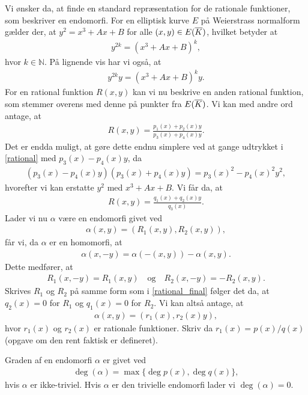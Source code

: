 Vi ønsker da, at finde en standard repræsentation for de rationale funktioner, som
beskriver en endomorfi. For en elliptisk kurve $E$ på Weierstrass normalform gælder
der, at $y^2 = x^3 + Ax + B$ for alle $(x, y) \in E(\overline{K})$, hvilket betyder at
\begin{align*}
	y^{2k} = (x^3 + Ax + B)^k,
\end{align*}
hvor $k \in \mathbb{N}$. På lignende vis har vi også, at 
\begin{align*}
	y^{2k} y = (x^3 + Ax + B)^k y.
\end{align*}
For en rational funktion $R(x, y)$ kan vi nu beskrive en anden rational funktion,
som stemmer overens med denne på punkter fra $E(\overline{K})$. Vi kan med andre ord antage,
at 
\begin{align}
	\label{rational}
	R(x, y) = \frac{p_1(x) + p_2(x)y}{p_3(x)+p_4(x)y}.
\end{align}
Det er endda muligt, at gøre dette endnu simplere ved at gange udtrykket i \eqref{rational}
med $p_3(x)-p_4(x)y$, da 
\begin{align*}
	(p_3(x) - p_4(x)y)(p_3(x)+p_4(x)y) = p_3(x)^2 - p_4(x)^2 y^2,
\end{align*}
hvorefter vi kan erstatte $y^2$ med $x^3+Ax+B$. Vi får da, at 
\begin{align}
	\label{rational_final}
	R(x, y) = \frac{q_1(x) + q_2(x)y}{q_3(x)}.
\end{align}
Lader vi nu $\alpha$ være en endomorfi givet ved
\begin{align*}
	\alpha(x, y) = (R_1(x, y), R_2(x, y)),
\end{align*}
får vi, da $\alpha$ er en homomorfi, at 
\begin{align*}
	\alpha(x, -y) = \alpha(-(x, y)) - \alpha(x, y).
\end{align*}
Dette medfører, at 
\begin{align*}
	R_1(x, -y) = R_1(x, y) \quad \text{og} \quad R_2(x, -y) = -R_2(x, y).
\end{align*}
Skrives $R_1$ og $R_2$ på samme form som i \eqref{rational_final} følger det da, at 
$q_2(x)=0$ for $R_1$ og $q_1(x)=0$ for $R_2$. Vi kan altså antage, at 
\begin{align*}
	\alpha(x, y) = (r_1(x), r_2(x)y),
\end{align*}
hvor $r_1(x)$ og $r_2(x)$ er rationale funktioner. Skriv da $r_1(x)=p(x)/q(x)$ (opgave om
den rent faktisk er defineret).

\begin{definition}
Graden af en endomorfi $\alpha$ er givet ved
\begin{align*}
	\deg(\alpha) = \max \{ \deg p(x), \deg q(x) \},
\end{align*}
hvis $\alpha$ er ikke-triviel. Hvis $\alpha$ er den trivielle endomorfi lader vi 
$\deg (\alpha) = 0$.
\end{definition}

